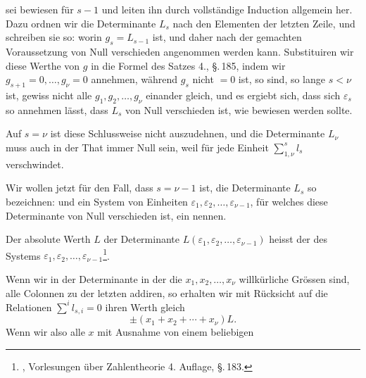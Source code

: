 sei bewiesen f\"ur $s - 1$ und leiten ihn durch vollst\"andige Induction allgemein her. Dazu ordnen wir die Determinante $L_s$ nach den Elementen der letzten Zeile, und schreiben sie so:
worin $g_s = L_{s-1}$ ist, und daher nach der gemachten Voraussetzung von Null verschieden angenommen werden kann. Substituiren wir diese Werthe von $g$ in die Formel des Satzes 4., \S.\,185, indem wir $g_{s+1} = 0, \ldots, g_\nu = 0$ annehmen, w\"ahrend $g_s$ nicht $= 0$ ist, so sind, so lange $s < \nu$ ist, gewiss nicht alle $g_1, g_2, \ldots, g_\nu$ einander gleich, und es ergiebt sich, dass sich $\varepsilon_s$ so annehmen l\"asst, dass $L_s$ von Null verschieden ist, wie bewiesen werden sollte.

Auf $s = \nu$ ist diese Schlussweise nicht auszudehnen, und die Determinante $L_\nu$ muss auch in der That immer Null sein, weil f\"ur jede Einheit $\sum\limits_{1,\nu}^{s} l_s$ verschwindet.

Wir wollen jetzt f\"ur den Fall, dass $s = \nu - 1$ ist, die Determinante $L_s$ so bezeichnen:
und ein System von Einheiten $\varepsilon_1, \varepsilon_2, \ldots, \varepsilon_{\nu-1}$, f\"ur welches diese Determinante von Null verschieden ist, ein  nennen.

Der absolute Werth $L$ der Determinante $L(\varepsilon_1, \varepsilon_2, \ldots, \varepsilon_{\nu-1})$ heisst der  des Systems $\varepsilon_1, \varepsilon_2, \ldots, \varepsilon_{\nu-1}$\footnote{, Vorlesungen \"uber Zahlentheorie 4. Auflage, \S.\,183.}.

Wenn wir in der Determinante
in der die $x_1, x_2, \ldots, x_\nu$ willk\"urliche Gr\"ossen sind, alle Colonnen zu der letzten addiren, so erhalten wir mit R\"ucksicht auf die Relationen $\sum\limits^{i} l_{s,i} = 0$
ihren Werth gleich
\[
\pm (x_1 + x_2 + \cdots + x_\nu) L.
\]
Wenn wir also alle $x$ mit Ausnahme von einem beliebigen

